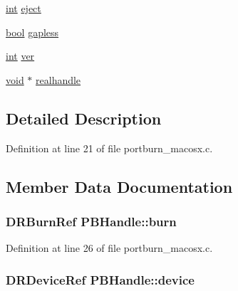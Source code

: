 \begin{DoxyCompactItemize}
\hyperlink{xmltok_8h_a5a0d4a5641ce434f1d23533f2b2e6653}{int} \hyperlink{struct_p_b_handle_a4b0523968938f3312f97cf1ced6a6629}{eject}
\item 
\hyperlink{mac_2config_2i386_2lib-src_2libsoxr_2soxr-config_8h_abb452686968e48b67397da5f97445f5b}{bool} \hyperlink{struct_p_b_handle_aae7ec727582fe8d6e3185024a80a4235}{gapless}
\item 
\hyperlink{xmltok_8h_a5a0d4a5641ce434f1d23533f2b2e6653}{int} \hyperlink{struct_p_b_handle_a56432885c220c0c95233669d02193f30}{ver}
\item 
\hyperlink{sound_8c_ae35f5844602719cf66324f4de2a658b3}{void} $\ast$ \hyperlink{struct_p_b_handle_a46e452618a7586428e9c32779bcd9f20}{realhandle}
\end{DoxyCompactItemize}


\subsection{Detailed Description}


Definition at line 21 of file portburn\+\_\+macosx.\+c.



\subsection{Member Data Documentation}
\subsubsection[{\texorpdfstring{burn}{burn}}]{\setlength{\rightskip}{0pt plus 5cm}D\+R\+Burn\+Ref P\+B\+Handle\+::burn}\hypertarget{struct_p_b_handle_a48175aac5ed9a8fcdc93d96123230a14}{}\label{struct_p_b_handle_a48175aac5ed9a8fcdc93d96123230a14}


Definition at line 26 of file portburn\+\_\+macosx.\+c.

\subsubsection[{\texorpdfstring{device}{device}}]{\setlength{\rightskip}{0pt plus 5cm}D\+R\+Device\+Ref P\+B\+Handle\+::device}\hypertarget{struct_p_b_handle_a95ad518d3bb1ffa20f7424f32b5cf513}{}\label{struct_p_b_handle_a95ad518d3bb1ffa20f7424f32b5cf513}


